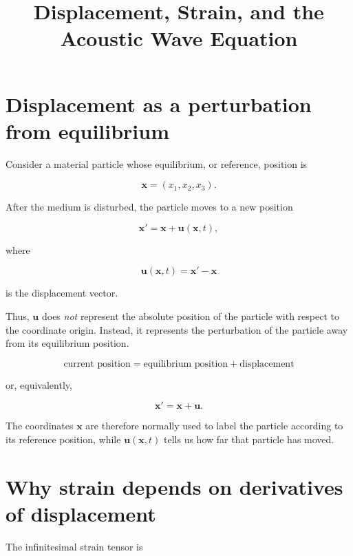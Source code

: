 \documentclass[11pt]{article}
\title{Displacement, Strain, and the Acoustic Wave Equation}
\author{}
\date{}
\begin{document}
\maketitle

\section{Displacement as a perturbation from equilibrium}

Consider a material particle whose equilibrium, or reference, position is

\begin{equation}
    \bm{x} = (x_1,x_2,x_3).
\end{equation}

After the medium is disturbed, the particle moves to a new position

\begin{equation}
    \bm{x}' = \bm{x} + \bm{u}(\bm{x},t),
\end{equation}

where

\begin{equation}
    \boxed{
    \bm{u}(\bm{x},t)
    =
    \bm{x}'-\bm{x}
    }
\end{equation}

is the displacement vector.

Thus, $\bm{u}$ does \emph{not} represent the absolute position of the particle with respect to the coordinate origin. Instead, it represents the perturbation of the particle away from its equilibrium position.

\begin{tcolorbox}[title=Key idea]
\[
\boxed{
\text{current position}
=
\text{equilibrium position}
+
\text{displacement}
}
\]

or, equivalently,

\[
\boxed{
\bm{x}'=\bm{x}+\bm{u}.
}
\]
\end{tcolorbox}

The coordinates $\bm{x}$ are therefore normally used to label the particle according to its reference position, while $\bm{u}(\bm{x},t)$ tells us how far that particle has moved.

\section{Why strain depends on derivatives of displacement}

The infinitesimal strain tensor is
\end{document}
